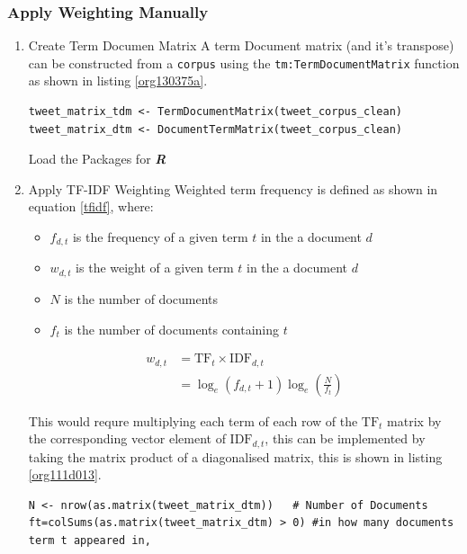 \documentclass[11pt]{article}
\begin{document}
\subsubsection{Apply Weighting Manually}
\label{sec:org1fe346f}
\begin{enumerate}
\item Create Term Documen Matrix
\label{sec:org4cbd0b0}
A term Document matrix (and it's transpose) can be constructed from a \texttt{corpus} using the
\texttt{tm:TermDocumentMatrix} function as shown in listing \ref{org130375a}.

\begin{listing}[htbp]
\begin{verbatim}
tweet_matrix_tdm <- TermDocumentMatrix(tweet_corpus_clean)
tweet_matrix_dtm <- DocumentTermMatrix(tweet_corpus_clean)
\end{verbatim}
\caption{\label{org130375a}Load the Packages for \textbf{\textbf{\emph{R}}}}
\end{listing}

\item Apply TF-IDF Weighting
\label{sec:org4f3ba0d}
Weighted term frequency is defined as shown in equation \eqref{tfidf}, where:

\begin{itemize}
\item \(f_{d,t}\) is the frequency of a given term \(t\) in the a document \(d\)
\item \(w_{d,t}\) is the weight of a given term \(t\) in the a document \(d\)
\item \(N\) is the number of documents
\item \(f_{t}\) is the number of documents containing \(t\)
\end{itemize}

\begin{equation}\begin{aligned}
w_{d, t} &=\mathrm{TF}_{t} \times \mathrm{IDF}_{d, t} \\
&=\log _{e}\left(f_{d, t}+1\right) \log _{e}\left(\frac{N}{f_{t}}\right) \label{tfidf}
\end{aligned}\end{equation}

This would requre multiplying each term of each row of the \(\mathrm{TF}_{t}\) matrix by the corresponding vector element of \(\mathrm{IDF}_{d,t}\), this can be implemented by taking the matrix product of a diagonalised matrix, this is shown in listing \ref{org111d013}.

\begin{listing}[htbp]
\begin{verbatim}
N <- nrow(as.matrix(tweet_matrix_dtm))   # Number of Documents
ft=colSums(as.matrix(tweet_matrix_dtm) > 0) #in how many documents term t appeared in,


\end{verbatim}
\end{listing}
\end{enumerate}
\end{document}
